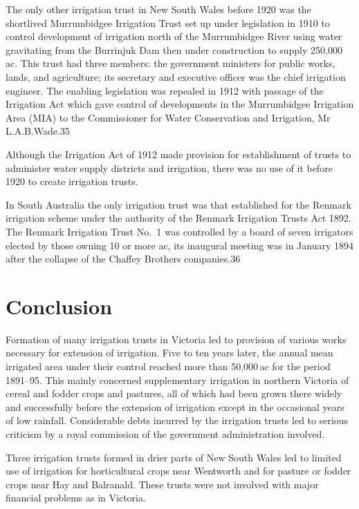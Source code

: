 The only other irrigation trust in New South Wales before 1920 was the
shortlived Murrumbidgee Irrigation Trust set up under legislation in
1910 to control development of irrigation north of the Murrumbidgee
River using water gravitating from the Burrinjuk Dam then under
construction to supply 250,000\,ac. This trust had three members: the
government ministers for public works, lands, and agriculture; its
secretary and executive officer was the chief irrigation engineer. The
enabling legislation was repealed in 1912 with passage of the
Irrigation Act which gave control of developments in the Murrumbidgee
Irrigation Area (MIA) to the Commissioner for Water Conservation and
Irrigation, Mr L.A.B.Wade.35

Although the Irrigation Act of 1912 made provision for establishment
of trusts to administer water supply districts and irrigation, there
was no use of it before 1920 to create irrigation trusts.

In South Australia the only irrigation trust was that established for
the Renmark irrigation scheme under the authority of the Renmark
Irrigation Trusts Act 1892. The Renmark Irrigation Trust No.~1 was
controlled by a board of seven irrigators elected by those owning 10
or more ac, its inaugural meeting was in January 1894 after the
collapse of the Chaffey Brothers companies.36

\section{Conclusion}

Formation of many irrigation trusts in Victoria led to provision of
various works necessary for extension of irrigation. Five to ten years
later, the annual mean irrigated area under their control reached more
than 50,000\,ac for the period 1891--95. This mainly concerned
supplementary irrigation in northern Victoria of cereal and fodder
crops and pastures, all of which had been grown there widely and
successfully before the extension of irrigation except in the
occasional years of low rainfall. Considerable debts incurred by the
irrigation trusts led to serious criticism by a royal commission of
the government administration involved.

Three irrigation trusts formed in drier parts of New South Wales led
to limited use of irrigation for horticultural crops near Wentworth
and for pasture or fodder crops near Hay and Balranald. These trusts
were not involved with major financial problems as in Victoria.

